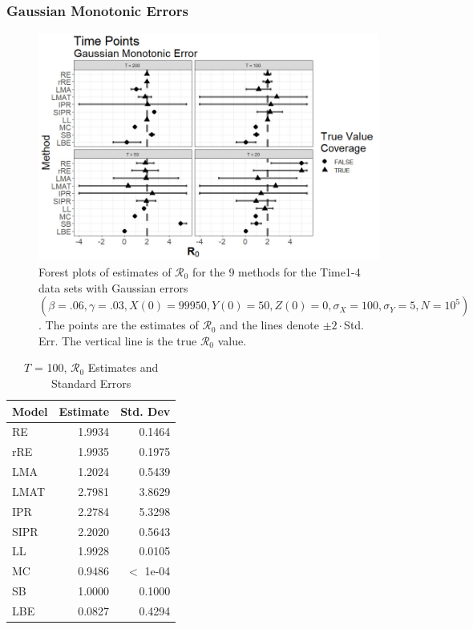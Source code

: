 \documentclass[12pt]{article}
\newcommand{\xxsir}{\ensuremath{9} } %
\newcommand{\rr}{\ensuremath{\mathcal{R}_0}}
\begin{document}
\subsubsection{Gaussian Monotonic Errors}
\begin{figure}[H]
	\centering
	\includegraphics[scale=0.5]{images/time_nm.jpg}
	\caption{Forest plots of estimates of $\rr$ for the \xxsir methods for the Time1-4 data sets with Gaussian errors $(\beta=.06, \gamma=.03, X(0)=99950, Y(0)=50, Z(0)=0, \sigma_X=100, \sigma_Y=5, N=10^5)$.  The points are the estimates of $\rr$ and the lines denote $\pm 2\cdot $Std. Err.  The vertical line is the true $\rr$ value.}
\end{figure}

\begin{table}[H]
	
	
	\centering
	\begin{tabular}[t]{l|r|r}
		\hline
		Model & Estimate & Std. Dev\\
		\hline
		RE & 1.9934 & 0.1464\\
		\hline
		rRE & 1.9935 & 0.1975\\
		\hline
		LMA & 1.2024 & 0.5439\\
		\hline
		LMAT & 2.7981 & 3.8629\\
		\hline
		IPR & 2.2784 & 5.3298\\
		\hline
		SIPR & 2.2020 & 0.5643\\
		\hline
		LL & 1.9928 & 0.0105\\
		\hline
		MC & 0.9486 & $<$ 1e-04\\
		\hline
		SB & 1.0000 & 0.1000\\
		\hline
		LBE & 0.0827 & 0.4294 \\
		\hline
	\end{tabular}
	\caption{ $T$ = 100, $\rr$ Estimates and Standard Errors}
\end{table}
\end{document}

